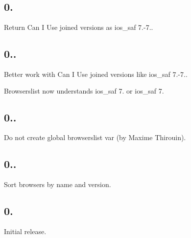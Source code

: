 \subsection*{0.}


\begin{DoxyItemize}
\item Return Can I Use joined versions as {\ttfamily ios\+\_\+saf 7.-\/7.}.
\end{DoxyItemize}

\subsection*{0..}


\begin{DoxyItemize}
\item Better work with Can I Use joined versions like {\ttfamily ios\+\_\+saf 7.-\/7.}.
\item Browserslist now understands {\ttfamily ios\+\_\+saf 7.} or {\ttfamily ios\+\_\+saf 7}.
\end{DoxyItemize}

\subsection*{0..}


\begin{DoxyItemize}
\item Do not create global {\ttfamily browserslist} var (by Maxime Thirouin).
\end{DoxyItemize}

\subsection*{0..}


\begin{DoxyItemize}
\item Sort browsers by name and version.
\end{DoxyItemize}

\subsection*{0.}


\begin{DoxyItemize}
\item Initial release. 
\end{DoxyItemize}
